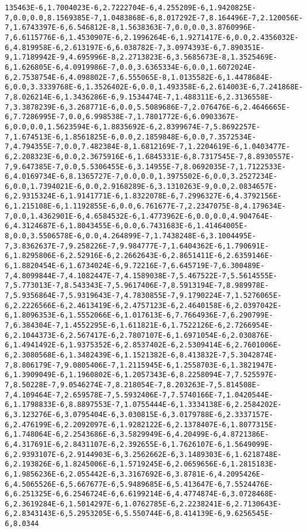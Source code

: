 \documentclass[11pt]{article}
\begin{document}
\begin{Verbatim}[commandchars=\\\{\}]
135463E-6,1.7004023E-6,2.7222704E-6,4.255209E-6,1.9420825E-7,0.0,0.0,8.1569385E-7,1.0483868E-6,8.017292E-7,8.164496E-7,2.120056E-7,1.6743397E-6,6.546812E-8,1.5638363E-7,0.0,0.0,3.8760996E-7,6.6115776E-6,1.4530907E-6,2.1996264E-6,1.9271417E-6,0.0,2.4356032E-6,4.819958E-6,2.613197E-6,6.038782E-7,3.0974393E-6,7.890351E-9,1.7189942E-9,4.695996E-8,2.2713823E-6,3.5685673E-8,1.3525469E-6,1.626805E-6,4.0919986E-7,0.0,3.6365334E-6,0.0,1.6072024E-6,2.7538754E-6,4.098802E-7,6.555065E-8,1.0135582E-6,1.4478684E-6,0.0,3.3339768E-6,1.3526402E-6,0.0,1.493358E-6,2.614003E-6,7.241868E-7,8.026214E-6,1.3436286E-6,9.1534474E-7,1.488311E-6,2.3136558E-7,3.3878239E-6,3.268771E-6,0.0,5.5089686E-7,2.076476E-6,2.4646665E-6,7.7286995E-7,0.0,6.998538E-7,1.7801772E-6,6.0903367E-6,0.0,0.0,1.5623594E-6,1.8835692E-6,2.8399674E-7,5.8692257E-7,1.674513E-6,1.8561825E-6,0.0,2.1859848E-6,0.0,7.3572534E-7,4.794355E-7,0.0,7.482384E-8,1.6812169E-7,1.2204619E-6,1.0403477E-6,2.208323E-6,0.0,2.3675916E-6,1.6845331E-6,8.7317545E-7,8.8930557E-7,9.647385E-7,0.0,5.5306455E-6,3.14955E-7,8.0692035E-7,1.7122533E-6,4.0169734E-6,8.1365727E-7,0.0,0.0,1.3975502E-6,0.0,3.2527234E-6,0.0,1.7394021E-6,0.0,2.9168289E-6,3.1310263E-9,0.0,2.0834657E-6,2.9315324E-6,1.9141771E-6,1.8322078E-6,7.2996327E-6,4.3792156E-6,1.215108E-6,1.1192855E-6,0.0,6.761677E-7,2.2347075E-8,4.179634E-7,0.0,1.4362901E-6,4.6584532E-6,1.4773962E-6,0.0,0.0,4.904764E-6,4.3124687E-6,1.8043455E-6,0.0,6.7431683E-6,1.41464005E-8,0.0,3.5506578E-6,0.0,4.264899E-7,1.7438248E-6,3.1004495E-7,3.8362637E-7,9.258226E-7,9.984777E-7,1.6404362E-6,1.790691E-6,1.8295806E-6,2.52916E-6,2.2662643E-6,2.8651411E-6,2.6359146E-6,1.8820454E-6,1.6734024E-6,9.72216E-7,6.645719E-7,6.300489E-7,4.8099844E-7,4.1082447E-7,4.1589038E-7,5.467522E-7,5.5614555E-7,5.773013E-7,8.543343E-7,5.9617406E-7,8.5913194E-7,8.989978E-7,5.9356864E-7,5.9319643E-7,4.7830855E-7,9.1790224E-7,1.5276065E-6,2.2226566E-6,2.4613419E-6,2.4757123E-6,2.4640158E-6,2.0397042E-6,1.8096353E-6,1.5552066E-6,1.017613E-6,7.7664936E-7,6.290799E-7,6.384304E-7,1.4552295E-6,1.611821E-6,1.7522126E-6,2.7266954E-6,2.1044373E-6,2.567417E-6,2.7807107E-6,1.6971054E-6,2.030876E-6,1.4941492E-6,1.9375352E-6,2.8537402E-6,2.5309414E-6,2.7601006E-6,2.3080568E-6,1.3482439E-6,1.1521382E-6,8.413832E-7,5.3042874E-7,8.806179E-7,9.0805406E-7,1.2115945E-6,1.2558703E-6,1.3821947E-6,1.3909049E-6,1.1960802E-6,1.2057343E-6,8.2258094E-7,7.525597E-7,8.50228E-7,9.0546274E-7,8.218054E-7,8.203263E-7,5.814508E-7,4.109464E-7,2.659578E-7,5.5932406E-7,7.5740166E-7,1.0420544E-6,1.1798833E-6,8.8897553E-7,1.0755444E-6,1.3334138E-6,2.2584202E-6,3.123276E-6,3.0795404E-6,3.030815E-6,3.0179788E-6,2.3337157E-6,2.476199E-6,2.2092097E-6,1.9282122E-6,2.1378407E-6,1.8077315E-6,1.748064E-6,2.2543686E-6,3.5829949E-6,4.20499E-6,4.8721386E-6,4.317691E-6,2.8431107E-6,2.392655E-6,1.7626107E-6,1.5649099E-6,2.9393107E-6,2.9144903E-6,3.2562662E-6,3.1489303E-6,1.6218748E-6,2.193826E-6,1.8245006E-6,1.5719245E-6,2.0659656E-6,1.2815183E-6,1.9856236E-6,2.055442E-6,3.3167692E-6,3.8781E-6,4.2095426E-6,4.5065526E-6,5.667677E-6,5.9489685E-6,5.413647E-6,7.5524476E-6,6.251325E-6,6.2546724E-6,6.6199214E-6,4.4774874E-6,3.0728468E-6,2.3619284E-6,1.5014297E-6,1.0762785E-6,2.2238241E-6,2.7130643E-6,2.8343143E-6,5.2953205E-6,5.550744E-6,8.414139E-6,9.6256545E-6,8.0344
\end{Verbatim}
\end{document}
